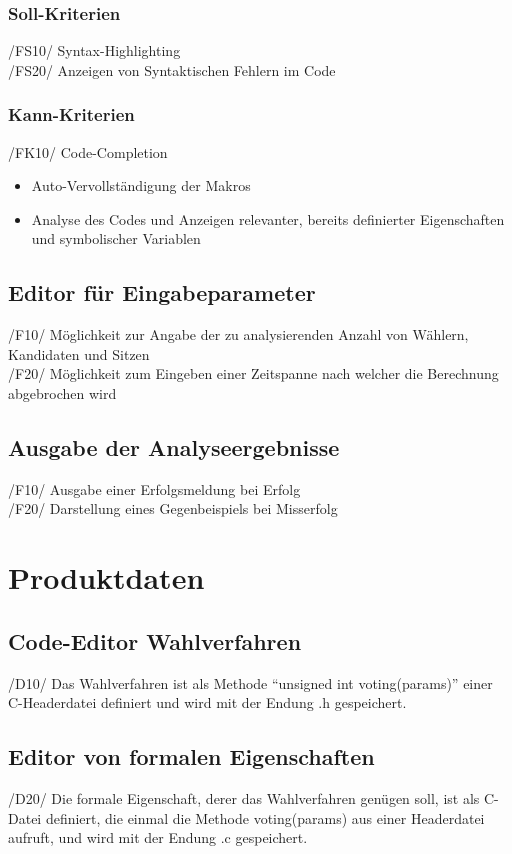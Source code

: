 \documentclass[a4paper]{scrreprt}
\begin{document}
\subsection{Soll-Kriterien}
/FS10/ Syntax-Highlighting \\
/FS20/ Anzeigen von Syntaktischen Fehlern im Code \\

\subsection{Kann-Kriterien}
/FK10/ Code-Completion
\begin{itemize}
\item Auto-Vervollständigung der Makros
\item Analyse des Codes und Anzeigen relevanter, bereits definierter Eigenschaften und symbolischer Variablen
\end{itemize}

\section{Editor für Eingabeparameter}
/F10/ Möglichkeit zur Angabe der zu analysierenden Anzahl von Wählern, Kandidaten und Sitzen \\
/F20/ Möglichkeit zum Eingeben einer Zeitspanne nach welcher die Berechnung abgebrochen wird \\

\section{Ausgabe der Analyseergebnisse}
/F10/ Ausgabe einer Erfolgsmeldung bei Erfolg \\
/F20/ Darstellung eines Gegenbeispiels bei Misserfolg\\ 

\chapter{Produktdaten}
\section{Code-Editor Wahlverfahren}
/D10/ Das Wahlverfahren ist als Methode "`unsigned int voting(params)"' einer C-Headerdatei definiert und wird mit der Endung .h gespeichert.

\section{Editor von formalen Eigenschaften}
/D20/ Die formale Eigenschaft, derer das Wahlverfahren genügen soll, ist als C-Datei definiert, die einmal die Methode voting(params) aus einer Headerdatei aufruft, und wird mit der Endung .c gespeichert.
\end{document}
